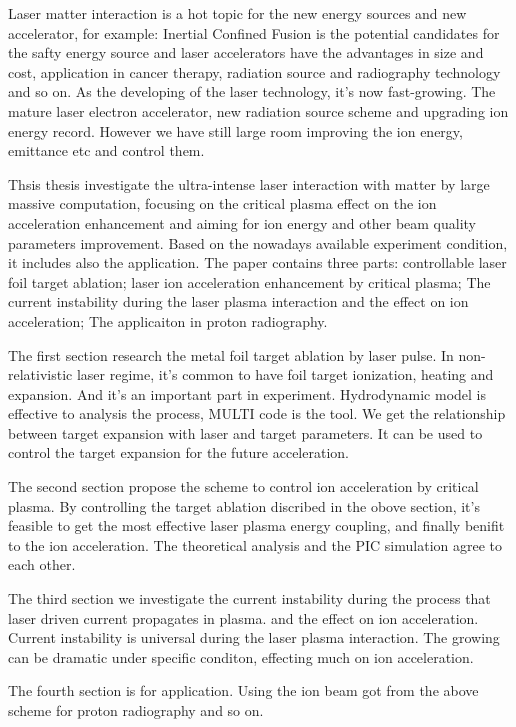 \begin{englishabstract}
Laser matter interaction is a hot topic for the new energy sources and new accelerator, for example: Inertial Confined Fusion is the potential candidates for the safty energy source and laser accelerators have the advantages in size and cost, application in cancer therapy, radiation source and radiography technology and so on.  As the developing of the laser technology, it's now fast-growing. The mature laser electron accelerator, new radiation source scheme and upgrading ion energy record. However we have still large room improving the ion energy, emittance etc and control them.

Thsis thesis investigate the ultra-intense laser interaction with matter by large massive computation,  focusing on the critical plasma effect on the ion acceleration enhancement and aiming for ion energy and other beam quality parameters improvement. Based on the nowadays available experiment condition, it includes also the application. The paper contains three parts: controllable laser foil target ablation; laser ion acceleration enhancement by critical plasma; The current instability during the laser plasma interaction and the effect on ion acceleration; The applicaiton in proton radiography.

The first section research the metal foil target ablation by laser pulse. In non-relativistic laser regime, it's common to have foil target ionization, heating and expansion. And it's an important part in experiment. Hydrodynamic model is effective to analysis the process, MULTI code is the tool. We get the relationship between target expansion with laser and target parameters. It can be used to control the target expansion for the future acceleration.


The second section propose the scheme to control ion acceleration by critical plasma. By controlling the target ablation discribed in the obove section, it's feasible to get the most effective laser plasma energy coupling, and finally benifit to the ion acceleration. The theoretical analysis and the  PIC simulation agree to each other.

The third section we investigate the current instability during the process that laser driven current  propagates in plasma. and the effect on ion acceleration. Current instability is universal during the laser plasma interaction. The growing can be dramatic under specific conditon, effecting much on ion acceleration. 

The fourth section is for application. Using the ion beam got from the above scheme for proton radiography and so on. 


 

\end{englishabstract}
